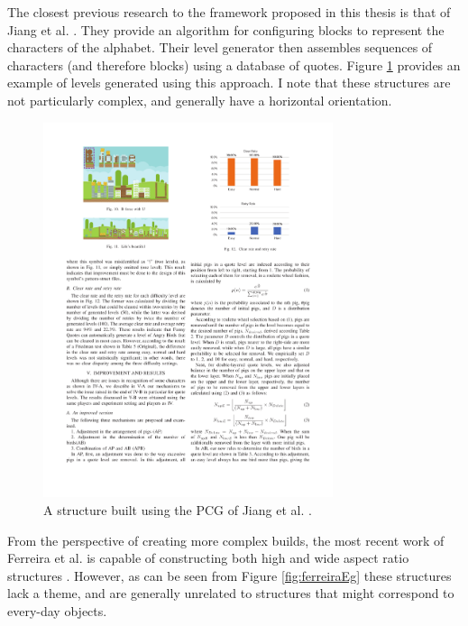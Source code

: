 \documentclass{dalthesis}
\begin{document}
The closest previous research to the framework proposed in this thesis is that of Jiang et al. \cite{jiang17}. They provide an algorithm for configuring blocks to represent the characters of the alphabet. Their level generator then assembles sequences of characters (and therefore blocks) using a database of quotes. Figure \ref{fig:jiangEg} provides an example of levels generated using this approach. I note that these structures are not particularly complex, and generally have a horizontal orientation.

\begin{figure}
\begin{center}
	\includegraphics[width=8.5cm]{./Jiang.pdf}
\caption{A structure built using the PCG of Jiang et al. \cite{jiang17}.}
\label{fig:jiangEg}
\end{center}
\end{figure}

From the perspective of creating more complex builds, the most recent work of Ferreira et al. is capable of constructing both high and wide aspect ratio structures \cite{ferreira18}. However, as can be seen from Figure \ref{fig:ferreiraEg} these structures lack a theme, and are generally unrelated to structures that might correspond to every-day objects.
\end{document}
